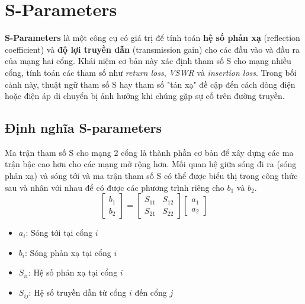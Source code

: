 \chapter{S-Parameters}
    \textbf{S-Parameters} là một công cụ có giá trị để tính toán 
    \textbf{hệ số phản xạ} (reflection coefficient) và \textbf{độ lợi truyền dẫn} (transmission gain)
    cho các đầu vào và đầu ra của mạng hai cổng. 
    Khái niệm cơ bản này xác định tham số S cho 
    mạng nhiều cổng, tính toán các tham số như 
    \textit{return loss}, \textit{VSWR} và 
    \textit{insertion loss}. 
    Trong bối cảnh này, thuật ngữ tham số S hay 
    tham số "tán xạ" đề cập đến cách dòng điện hoặc 
    điện áp di chuyển bị ảnh hưởng khi chúng gặp sự 
    cố trên đường truyền.

    \section{Định nghĩa S-parameters}
        Ma trận tham số S cho mạng 2 cổng là thành phần cơ bản để xây dựng các ma trận bậc cao hơn cho các mạng mở rộng hơn. 
        Mối quan hệ giữa sóng đi ra (sóng phản xạ) và sóng tới và ma trận tham số S có thể được biểu thị 
        trong công thức sau và nhân với nhau để có được các phương trình riêng cho $b_1$ và $b_2$.
        \cite{cadence2023sparams}
        \begin{equation}
            \begin{bmatrix}
                b_1 \\
                b_2
            \end{bmatrix}
                =
            \begin{bmatrix}
                S_{11} & S_{12} \\
                S_{21} & S_{22}
            \end{bmatrix}
            \begin{bmatrix}
                a_1 \\
                a_2
            \end{bmatrix}
        \end{equation}
        \begin{itemize}
            \item $a_i$: Sóng tới tại cổng $i$
            \item $b_i$: Sóng phản xạ tại cổng $i$
            \item $S_{ii}$: Hệ số phản xạ tại cổng $i$
            \item $S_{ij}$: Hệ số truyền dẫn từ cổng $i$ đến cổng $j$
        \end{itemize}

